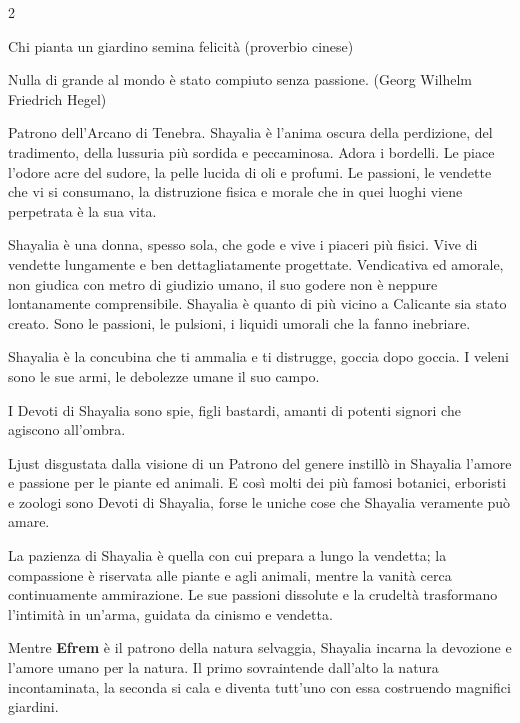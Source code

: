 \begin{multicols}{2}
\begin{enfasi}{
Chi pianta un giardino semina felicità (proverbio cinese)

\medskip

Nulla di grande al mondo è stato compiuto senza passione. (Georg Wilhelm Friedrich Hegel)

}\end{enfasi}

Patrono dell'Arcano di Tenebra. Shayalia è l'anima oscura della perdizione, del tradimento, della lussuria più sordida e peccaminosa. Adora i bordelli. Le piace l'odore acre del sudore, la pelle lucida di oli e profumi. Le passioni, le vendette che vi si consumano, la distruzione fisica e morale che in quei luoghi viene perpetrata è la sua vita.

Shayalia è una donna, spesso sola, che gode e vive i piaceri più fisici. Vive di vendette lungamente e ben dettagliatamente progettate. Vendicativa ed amorale, non giudica con metro di giudizio umano, il suo godere non è neppure lontanamente comprensibile. Shayalia è quanto di più vicino a Calicante sia stato creato. Sono le passioni, le pulsioni, i liquidi umorali che la fanno inebriare.

Shayalia è la concubina che ti ammalia e ti distrugge, goccia dopo goccia. I veleni sono le sue armi, le debolezze umane il suo campo.

I Devoti di Shayalia sono spie, figli bastardi, amanti di potenti signori che agiscono all'ombra.

Ljust disgustata dalla visione di un Patrono del genere instillò in Shayalia l'amore e passione per le piante ed animali. E così molti dei più famosi botanici, erboristi e zoologi sono Devoti di Shayalia, forse le uniche cose che Shayalia veramente può amare.

La pazienza di Shayalia è quella con cui prepara a lungo la vendetta; la compassione è riservata alle piante e agli animali, mentre la vanità cerca continuamente ammirazione. Le sue passioni dissolute e la crudeltà trasformano l'intimità in un'arma, guidata da cinismo e vendetta.

\medskip

\begin{narratore}
Mentre \textbf{Efrem} è il patrono della natura selvaggia, Shayalia incarna la devozione e l'amore umano per la natura. Il primo sovraintende dall'alto la natura incontaminata, la seconda si cala e diventa tutt'uno con essa costruendo magnifici giardini.


\end{narratore}
\end{multicols}
